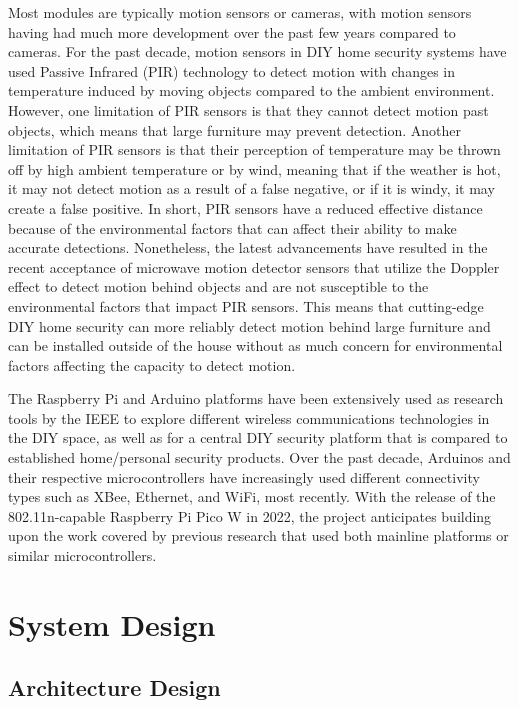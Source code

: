 \documentclass[conference]{IEEEtran}
\begin{document}
Most modules are typically motion sensors or cameras, with motion sensors having had
much more development over the past few years compared to cameras. For the past
decade, motion sensors in DIY home security systems have used
Passive Infrared (PIR) technology to detect motion with changes in temperature
induced by moving objects compared to the ambient environment.\cite{sarhan2020} However, one
limitation of PIR sensors is that they cannot detect motion past objects, which
means that large furniture may prevent detection. Another limitation of PIR sensors
is that their perception of temperature may be thrown off by high ambient temperature
or by wind, meaning that if the weather is hot, it may not detect motion as a result
of a false negative, or if it is windy, it may create a false positive.\cite{sarhan2020} In short,
PIR sensors have a reduced effective distance because of the environmental factors
that can affect their ability to make accurate detections. Nonetheless, the latest
advancements have resulted in the recent acceptance of microwave motion detector
sensors that utilize the Doppler effect to detect motion behind objects and are not
susceptible to the environmental factors that impact PIR sensors.\cite{sarhan2020} This means
that cutting-edge DIY home security can more reliably detect motion behind large
furniture and can be installed outside of the house without as much concern for
environmental factors affecting the capacity to detect motion.

The Raspberry Pi and Arduino platforms have been extensively used as research tools
by the IEEE to explore different wireless communications technologies in the DIY
space, as well as for a central DIY security platform that is compared to established
home/personal security products.\cite{sarhan2020} Over the past decade, Arduinos and their
respective microcontrollers have increasingly used different connectivity types
such as XBee, Ethernet, and WiFi, most recently.\cite{sarhan2020} With the release of the
802.11n-capable Raspberry Pi Pico W in 2022, the project anticipates building
upon the work covered by previous research that used both mainline platforms or
similar microcontrollers.

\section{System Design}

\subsection{Architecture Design}
\end{document}

